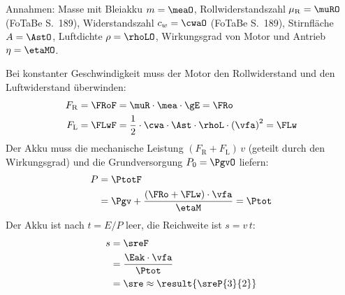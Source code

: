\begin{abcliste}
\abc Annahmen: Masse mit Bleiakku $m = \meaO$, Rollwiderstandszahl $\mu_\mathrm{R} = \muRO$ (FoTaBe S.~189), Widerstandszahl $c_w = \cwaO$ (FoTaBe S.~189), Stirnfläche $A = \AstO$, Luftdichte $\rho = \rhoLO$, Wirkungsgrad von Motor und Antrieb $\eta = \etaMO$.

Bei konstanter Geschwindigkeit muss der Motor den Rollwiderstand und den Luftwiderstand überwinden:
\begin{align}
 F_\mathrm{R} &= \FRoF = \muR\cdot\mea\cdot\gE = \FRo \\
 F_\mathrm{L} &= \FLwF = \frac{1}{2}\cdot\cwa\cdot\Ast\cdot\rhoL\cdot\left(\vfa\right)^2 = \FLw
\end{align}
Der Akku muss die mechanische Leistung $(F_\mathrm{R}+F_\mathrm{L})\,v$ (geteilt durch den Wirkungsgrad) und die Grundversorgung $P_0 = \PgvO$ liefern:
\begin{align}
 P &= \PtotF \\
   &= \Pgv+\frac{\left(\FRo+\FLw\right)\cdot\vfa}{\etaM} = \Ptot
\end{align}
Der Akku ist nach $t = E/P$ leer, die Reichweite ist $s = v\,t$:
\begin{align}
 s &= \sreF \\
   &= \frac{\Eak\cdot\vfa}{\Ptot} \\
   &= \sre \approx \result{\sreP{3}{2}}
\end{align}


\end{abcliste}

